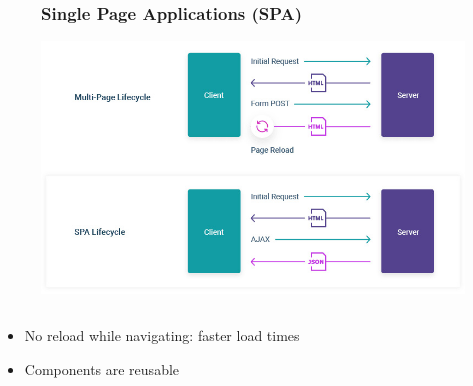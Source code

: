 \documentclass{beamer}
\begin{document}
\begin{frame}
			\begin{figure}
				\frametitle{Single Page Applications (SPA)}
				\includegraphics[width=.8\textwidth]{spa.jpg}
			\end{figure}
\begin{columns}
		\begin{column}{1\textwidth}%
				\begin{itemize}
					
					\item No reload while navigating: faster load times
					\item Components are reusable
				\end{itemize}
	\end{column}
	\end{columns}
\end{frame}
\end{document}

